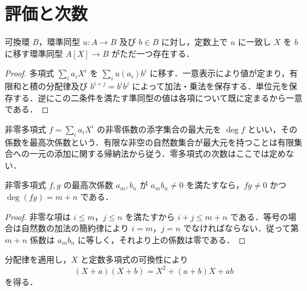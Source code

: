 \section{評価と次数}
\begin{prop}[多項式環の普遍性]
可換環 $B$，環準同型 $u:A\to B$ 及び $b\in B$ に対し，定数上で $u$ に一致し $X$ を $b$ に移す環準同型 $A[X]\to B$ がただ一つ存在する．
\end{prop}
\begin{proof}
多項式 $\sum_i a_iX^i$ を $\sum_i u(a_i)b^i$ に移す．一意表示により値が定まり，有限和と積の分配律及び $b^{i+j}=b^ib^j$ によって加法・乗法を保存する．単位元を保存する．逆にこの二条件を満たす準同型の値は各項について既に定まるから一意である．
\end{proof}
\begin{defn}[多項式の次数]
非零多項式 $f=\sum_i a_iX^i$ の非零係数の添字集合の最大元を $\deg f$ といい，その係数を最高次係数という．有限な非空の自然数集合が最大元を持つことは有限集合への一元の添加に関する帰納法から従う．零多項式の次数はここでは定めない．
\end{defn}
\begin{prop}[積の次数]
非零多項式 $f,g$ の最高次係数 $a_m,b_n$ が $a_mb_n\ne0$ を満たすなら，$fg\ne0$ かつ $\deg(fg)=m+n$ である．
\end{prop}
\begin{proof}
非零な項は $i\leq m$，$j\leq n$ を満たすから $i+j\leq m+n$ である．等号の場合は自然数の加法の簡約律により $i=m$，$j=n$ でなければならない．従って第 $m+n$ 係数は $a_mb_n$ に等しく，それより上の係数は零である．
\end{proof}
\begin{prop}[一次式の積]
分配律を適用し，$X$ と定数多項式の可換性により
\[
(X+a)(X+b)=X^2+(a+b)X+ab
\]
を得る．
\end{prop}

